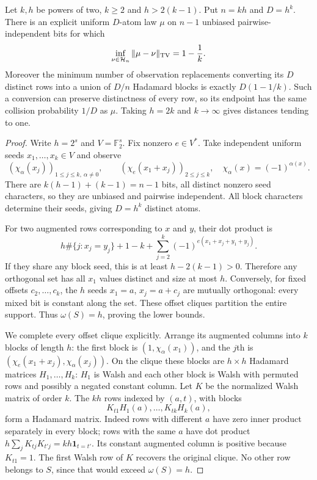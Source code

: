\begin{theorem}
\label{s25:thm:design-sharp-distance}
Let $k,h$ be powers of two, $k\ge2$ and $h>2(k-1)$. Put
$n=kh$ and $D=h^k$. There is an explicit uniform $D$-atom law $\mu$
on $n-1$ unbiased pairwise-independent bits for which
\[
 \inf_{\nu\in\mathcal H_n}\|\mu-\nu\|_{\rm TV}=1-\frac1k.
\]
Moreover the minimum number of observation replacements converting
its $D$ distinct rows into a union of $D/n$ Hadamard blocks is exactly
$D(1-1/k)$. Such a conversion can preserve distinctness of every row,
so its endpoint has the same collision probability $1/D$ as $\mu$.
Taking $h=2k$ and $k\to\infty$ gives distances tending to one.
\end{theorem}
\begin{proof}
Write $h=2^s$ and $V=\mathbb F_2^s$. Fix nonzero $e\in V^*$.
Take independent uniform seeds $x_1,\ldots,x_k\in V$ and observe
\[
 (\chi_\alpha(x_j))_{1\le j\le k,\ \alpha\ne0},\qquad
 (\chi_e(x_1+x_j))_{2\le j\le k},
 \quad\chi_\alpha(x)=(-1)^{\alpha(x)}.
\]
There are $k(h-1)+(k-1)=n-1$ bits, all distinct nonzero seed
characters, so they are unbiased and pairwise independent. All block
characters determine their seeds, giving $D=h^k$ distinct atoms.

For two augmented rows corresponding to $x$ and $y$, their dot product is
\[
 h\#\{j:x_j=y_j\}+1-k+
 \sum_{j=2}^k(-1)^{e(x_1+x_j+y_1+y_j)}.
\]
If they share any block seed, this is at least $h-2(k-1)>0$.
Therefore any orthogonal set has all $x_1$ values distinct and size
at most $h$. Conversely, for fixed offsets $c_2,\ldots,c_k$, the $h$
seeds $x_1=a$, $x_j=a+c_j$ are mutually orthogonal: every mixed bit
is constant along the set. These offset cliques partition the entire
support. Thus $\omega(S)=h$, proving the lower bounds.

We complete every offset clique explicitly. Arrange its augmented
columns into $k$ blocks of length $h$: the first block is
$(1,\chi_\alpha(x_1))$, and the $j$th is
$(\chi_e(x_1+x_j),\chi_\alpha(x_j))$. On the clique these blocks
are $h\times h$ Hadamard matrices $H_1,\ldots,H_k$:
$H_1$ is Walsh and each other block is Walsh with permuted rows and
possibly a negated constant column. Let $K$ be the normalized Walsh
matrix of order $k$. The $kh$ rows indexed by $(a,t)$, with blocks
\[
 K_{t1}H_1(a),\ldots,K_{tk}H_k(a),
\]
form a Hadamard matrix. Indeed rows with different $a$ have zero inner
product separately in every block; rows with the same $a$ have dot
product $h\sum_jK_{tj}K_{t'j}=kh\mathbf1_{t=t'}$.
Its constant augmented column is positive because $K_{t1}=1$.
The first Walsh row of $K$ recovers the original clique. No other row
belongs to $S$, since that would exceed $\omega(S)=h$.


\end{proof}
